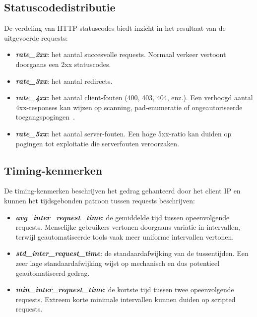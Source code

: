 

\subsection{Statuscodedistributie} 
\label{subsec:statuscodedistributie}

De verdeling van HTTP-statuscodes biedt inzicht in het resultaat van de uitgevoerde requests:

\begin{itemize}
    \item \textbf{\textit{rate\_2xx}}: het aantal succesvolle requests. Normaal verkeer vertoont doorgaans een 2xx statuscodes.
    \item \textbf{\textit{rate\_3xx}}: het aantal redirects.
    \item \textbf{\textit{rate\_4xx}}: het aantal client-fouten (400, 403, 404, enz.). Een verhoogd aantal 4xx-responses kan wijzen op scanning, pad-enumeratie of ongeautoriseerde toegangspogingen~\autocite{OWASP2023}.
    \item \textbf{\textit{rate\_5xx}}: het aantal server-fouten. Een hoge 5xx-ratio kan duiden op pogingen tot exploitatie die serverfouten veroorzaken.
\end{itemize}

\subsection{Timing-kenmerken} 
\label{subsec:timing-kenmerken}

De timing-kenmerken beschrijven het gedrag gehanteerd door het client IP en kunnen het tijdsgebonden patroon tussen requests beschrijven:

\begin{itemize}
    \item \textbf{\textit{avg\_inter\_request\_time}}: de gemiddelde tijd tussen opeenvolgende requests. Menselijke gebruikers vertonen doorgaans variatie in intervallen, terwijl geautomatiseerde tools vaak meer uniforme intervallen vertonen.
    \item \textbf{\textit{std\_inter\_request\_time}}: de standaardafwijking van de tussentijden. Een zeer lage standaardafwijking wijst op mechanisch en dus potentieel geautomatiseerd gedrag.
    \item \textbf{\textit{min\_inter\_request\_time}}: de kortste tijd tussen twee opeenvolgende requests. Extreem korte minimale intervallen kunnen duiden op scripted requests.
\end{itemize}

